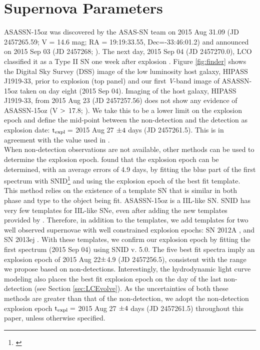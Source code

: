 \documentclass[a4paper,fleqn,usenatbib]{mnras}
\begin{document}
\section{Supernova Parameters} \label{15ozIntro}
ASASSN-15oz was discovered by the ASAS-SN team on 2015 Aug 31.09 (JD 2457265.59; V = 14.6 mag; RA = 19:19:33.55, Dec=-33:46:01.2) and announced on 2015 Sep 03 (JD 2457268; \citealt{2015brown}). 
The next day, 2015 Sep 04 (JD 2457270.0), LCO classified it as a Type II SN one week after explosion \citep{2015hosseinzadeh}. 
Figure \ref{fig:finder} shows the Digital Sky Survey (DSS) image of the low luminosity host galaxy, HIPASS J1919-33, prior to explosion (top panel) and our first {\it V}-band image of ASASSN-15oz taken on day eight (2015 Sep 04).
Imaging of the host galaxy, HIPASS J1919-33, from 2015 Aug 23 (JD 2457257.56) does not show any evidence of ASASSN-15oz (V $\rm{>}$ 17.8; \citealt{2015brown}). 
We take this to be a lower limit on the explosion epoch and define the mid-point between the non-detection and the detection as explosion date: $\rm{t_{expl} =}$ 2015 Aug 27 $\rm{\pm 4}$ days (JD 2457261.5). 
This is in agreement with the value used in \citet{2018gutierrez}.\\
\indent When non-detection observations are not available, other methods can be used to determine the explosion epoch. 
\citet{2017gutierrez} found that the explosion epoch can be determined, with an average errors of 4.9 days, by fitting the blue part of the first spectrum with SNID\footnote{\citet{2011blondin}} 
\citep{2007blondin} and using the explosion epoch of the best fit template.
This method relies on the existence of a template SN that is similar in both phase and type to the object being fit.
ASASSN-15oz is a IIL-like SN. 
SNID has very few templates for IIL-like SNe, even after adding the new templates provided by \citet{2017gutierrez}. 
Therefore, in addition to the \citet{2017gutierrez} templates, we add templates for two well observed supernovae with well constrained explosion epochs: SN 2012A \citep{2013tomasella}, and SN 2013ej \citep{2016childress,2016dhungana,2014valenti,2015smartt}.
With these templates, we confirm our explosion epoch by fitting the first spectrum (2015 Sep 04) using SNID v. 5.0.
The five best fit spectra imply an explosion epoch of  2015 Aug 22$\rm{\pm}$4.9 (JD 2457256.5), consistent with the range we propose based on non-detections.
Interestingly, the hydrodynamic light curve modeling also places the best fit explosion epoch on the day of the last non-detection (see Section \ref{sec:LCEvolve}).
As the uncertainties of both these methods are greater than that of the non-detection, we adopt the non-detection explosion epoch $\rm{t_{expl} =}$ 2015 Aug 27 $\rm{\pm 4}$ days (JD 2457261.5) throughout this paper, unless otherwise specified.
\end{document}
